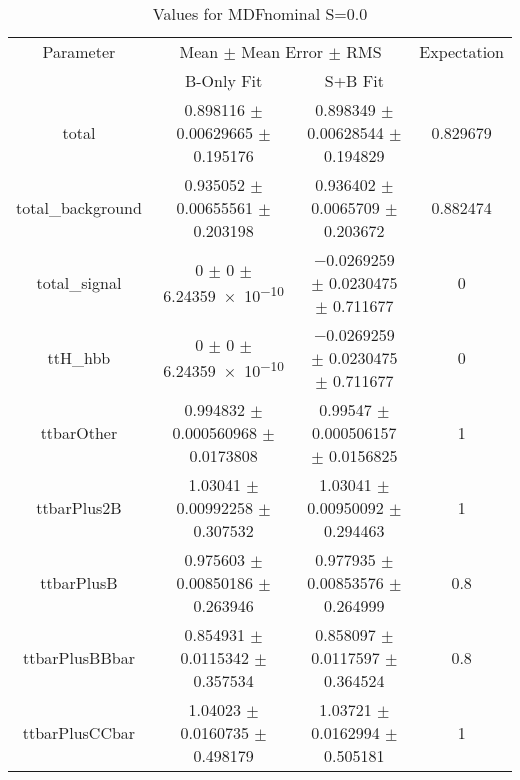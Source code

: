 \begin{table}
\centering
\caption{Values for MDFnominal S=0.0}
\begin{tabular}{cccc}
\toprule
Parameter & \multicolumn{2}{c}{Mean $\pm$ Mean Error $\pm$ RMS} & Expectation\\
 & B-Only Fit & S+B Fit & \\
\midrule
total & \num{0.898116} $\pm$ \num{0.00629665} $\pm$ \num{0.195176} & \num{0.898349} $\pm$ \num{0.00628544} $\pm$ \num{0.194829} & \num{0.829679}\\
total\_background & \num{0.935052} $\pm$ \num{0.00655561} $\pm$ \num{0.203198} & \num{0.936402} $\pm$ \num{0.0065709} $\pm$ \num{0.203672} & \num{0.882474}\\
total\_signal & \num{0} $\pm$ \num{0} $\pm$ \num{6.24359e-10} & \num{-0.0269259} $\pm$ \num{0.0230475} $\pm$ \num{0.711677} & \num{0}\\
ttH\_hbb & \num{0} $\pm$ \num{0} $\pm$ \num{6.24359e-10} & \num{-0.0269259} $\pm$ \num{0.0230475} $\pm$ \num{0.711677} & \num{0}\\
ttbarOther & \num{0.994832} $\pm$ \num{0.000560968} $\pm$ \num{0.0173808} & \num{0.99547} $\pm$ \num{0.000506157} $\pm$ \num{0.0156825} & \num{1}\\
ttbarPlus2B & \num{1.03041} $\pm$ \num{0.00992258} $\pm$ \num{0.307532} & \num{1.03041} $\pm$ \num{0.00950092} $\pm$ \num{0.294463} & \num{1}\\
ttbarPlusB & \num{0.975603} $\pm$ \num{0.00850186} $\pm$ \num{0.263946} & \num{0.977935} $\pm$ \num{0.00853576} $\pm$ \num{0.264999} & \num{0.8}\\
ttbarPlusBBbar & \num{0.854931} $\pm$ \num{0.0115342} $\pm$ \num{0.357534} & \num{0.858097} $\pm$ \num{0.0117597} $\pm$ \num{0.364524} & \num{0.8}\\
ttbarPlusCCbar & \num{1.04023} $\pm$ \num{0.0160735} $\pm$ \num{0.498179} & \num{1.03721} $\pm$ \num{0.0162994} $\pm$ \num{0.505181} & \num{1}\\
\bottomrule
\end{tabular}
\end{table}